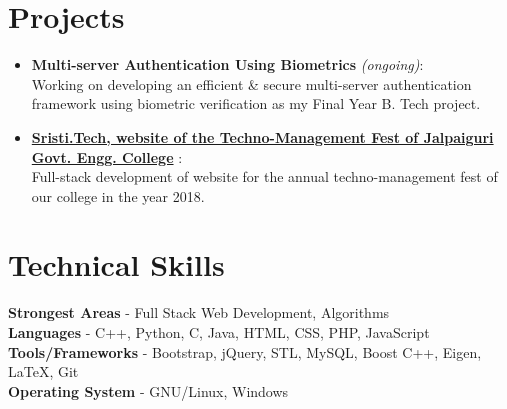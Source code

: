 \documentclass[margin, centered]{res}
\begin{document}
\begin{resume}
\section{Projects}
\begin{itemize}[leftmargin=*]
\item
\textbf{Multi-server Authentication Using Biometrics} \textit{(ongoing)}:\\ Working on developing an efficient \& secure multi-server authentication framework using biometric verification as my Final Year B. Tech project.
\item
\textbf{\href{http://sristi.tech}{Sristi.Tech, website of the Techno-Management Fest of Jalpaiguri Govt. Engg. College}} :\\ Full-stack development of website for the annual techno-management fest of our college in the year 2018.
 
\end{itemize}

\section{Technical \hspace{2mm} Skills}
\textbf{Strongest Areas} - Full Stack Web Development, Algorithms\\
\textbf{Languages} - C++, Python, C, Java, HTML, CSS, PHP, JavaScript\\
\textbf{Tools/Frameworks} - Bootstrap, jQuery, STL, MySQL, Boost C++, Eigen, \LaTeX, Git\\
\textbf{Operating System} - GNU/Linux, Windows




\end{resume}
\end{document}
